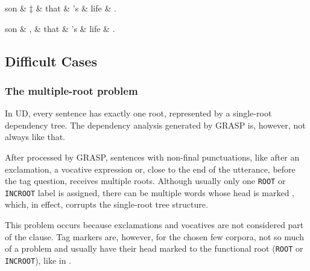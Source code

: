 \begin{minipage}{\widefigurewidth}
\begin{dependency}[edge slant=3pt]
	\begin{deptext}[column sep=0.7cm]
	son \& ‡ \& that \& 's \& life \& .\\
	\end{deptext}
\end{dependency}
\hfill
\begin{dependency}[edge slant=3pt]
	\begin{deptext}[column sep=0.7cm]
	son \& , \& that \& 's \& life \& .\\
	\end{deptext}
\end{dependency}
\end{minipage}
\label{fig:voc}

\subsection{Difficult Cases}\label{sec:grdifficult}
\subsubsection{The multiple-root problem}
In UD, every sentence has exactly one root, represented by a single-root dependency tree. The dependency analysis generated by GRASP is, however, not always like that.

After processed by GRASP, sentences with non-final punctuations, like after an exclamation, a vocative expression or, close to the end of the utterance, before the tag question, receives multiple roots. Although usually only one \texttt{ROOT} or \texttt{INCROOT} label is assigned, there can be multiple words whose head is marked , which, in effect, corrupts the single-root tree structure.

This problem occurs because exclamations and vocatives are not considered part of the clause. Tag markers are, however, for the chosen few corpora, not so much of a problem and usually have their head marked to the functional root (\texttt{ROOT} or \texttt{INCROOT}), like in .

